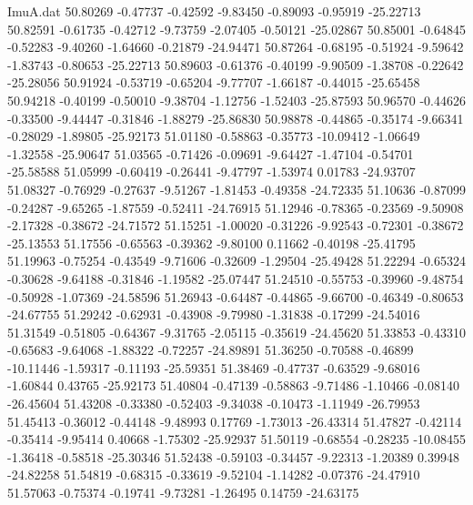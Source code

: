 \begin{filecontents}{ImuA.dat}
  50.80269   -0.47737   -0.42592   -9.83450   -0.89093   -0.95919  -25.22713
  50.82591   -0.61735   -0.42712   -9.73759   -2.07405   -0.50121  -25.02867
  50.85001   -0.64845   -0.52283   -9.40260   -1.64660   -0.21879  -24.94471
  50.87264   -0.68195   -0.51924   -9.59642   -1.83743   -0.80653  -25.22713
  50.89603   -0.61376   -0.40199   -9.90509   -1.38708   -0.22642  -25.28056
  50.91924   -0.53719   -0.65204   -9.77707   -1.66187   -0.44015  -25.65458
  50.94218   -0.40199   -0.50010   -9.38704   -1.12756   -1.52403  -25.87593
  50.96570   -0.44626   -0.33500   -9.44447   -0.31846   -1.88279  -25.86830
  50.98878   -0.44865   -0.35174   -9.66341   -0.28029   -1.89805  -25.92173
  51.01180   -0.58863   -0.35773  -10.09412   -1.06649   -1.32558  -25.90647
  51.03565   -0.71426   -0.09691   -9.64427   -1.47104   -0.54701  -25.58588
  51.05999   -0.60419   -0.26441   -9.47797   -1.53974    0.01783  -24.93707
  51.08327   -0.76929   -0.27637   -9.51267   -1.81453   -0.49358  -24.72335
  51.10636   -0.87099   -0.24287   -9.65265   -1.87559   -0.52411  -24.76915
  51.12946   -0.78365   -0.23569   -9.50908   -2.17328   -0.38672  -24.71572
  51.15251   -1.00020   -0.31226   -9.92543   -0.72301   -0.38672  -25.13553
  51.17556   -0.65563   -0.39362   -9.80100    0.11662   -0.40198  -25.41795
  51.19963   -0.75254   -0.43549   -9.71606   -0.32609   -1.29504  -25.49428
  51.22294   -0.65324   -0.30628   -9.64188   -0.31846   -1.19582  -25.07447
  51.24510   -0.55753   -0.39960   -9.48754   -0.50928   -1.07369  -24.58596
  51.26943   -0.64487   -0.44865   -9.66700   -0.46349   -0.80653  -24.67755
  51.29242   -0.62931   -0.43908   -9.79980   -1.31838   -0.17299  -24.54016
  51.31549   -0.51805   -0.64367   -9.31765   -2.05115   -0.35619  -24.45620
  51.33853   -0.43310   -0.65683   -9.64068   -1.88322   -0.72257  -24.89891
  51.36250   -0.70588   -0.46899  -10.11446   -1.59317   -0.11193  -25.59351
  51.38469   -0.47737   -0.63529   -9.68016   -1.60844    0.43765  -25.92173
  51.40804   -0.47139   -0.58863   -9.71486   -1.10466   -0.08140  -26.45604
  51.43208   -0.33380   -0.52403   -9.34038   -0.10473   -1.11949  -26.79953
  51.45413   -0.36012   -0.44148   -9.48993    0.17769   -1.73013  -26.43314
  51.47827   -0.42114   -0.35414   -9.95414    0.40668   -1.75302  -25.92937
  51.50119   -0.68554   -0.28235  -10.08455   -1.36418   -0.58518  -25.30346
  51.52438   -0.59103   -0.34457   -9.22313   -1.20389    0.39948  -24.82258
  51.54819   -0.68315   -0.33619   -9.52104   -1.14282   -0.07376  -24.47910
  51.57063   -0.75374   -0.19741   -9.73281   -1.26495    0.14759  -24.63175

\end{filecontents}
